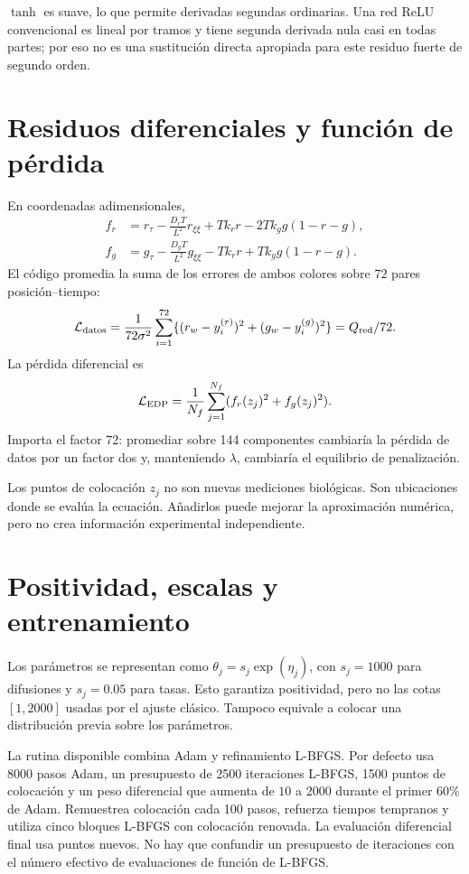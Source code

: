 \documentclass[11pt,a4paper]{report}
\begin{document}
$\tanh$ es suave, lo que permite derivadas segundas ordinarias. Una red ReLU convencional es lineal por tramos y tiene segunda derivada nula casi en todas partes; por eso no es una sustitución directa apropiada para este residuo fuerte de segundo orden.

\section{Residuos diferenciales y función de pérdida}
En coordenadas adimensionales,
\begin{align}
f_r&=r_\tau-\frac{D_rT}{L^2}r_{\xi\xi}+Tk_rr-2Tk_gg(1-r-g),\\
f_g&=g_\tau-\frac{D_gT}{L^2}g_{\xi\xi}-Tk_rr+Tk_gg(1-r-g).
\end{align}
El código promedia la suma de los errores de ambos colores sobre $72$ pares posición--tiempo:
\[
\mathcal L_{\rm datos}=\frac{1}{72\sigma^2}\sum_{i=1}^{72}
\{(r_w-y_i^{(r)})^2+(g_w-y_i^{(g)})^2\}=Q_{\rm red}/72.
\]
La pérdida diferencial es
\[
\mathcal L_{\rm EDP}=\frac1{N_f}\sum_{j=1}^{N_f}(f_r(z_j)^2+f_g(z_j)^2).
\]
Importa el factor 72: promediar sobre 144 componentes cambiaría la pérdida de datos por un factor dos y, manteniendo $\lambda$, cambiaría el equilibrio de penalización.

Los puntos de colocación $z_j$ no son nuevas mediciones biológicas. Son ubicaciones donde se evalúa la ecuación. Añadirlos puede mejorar la aproximación numérica, pero no crea información experimental independiente.

\section{Positividad, escalas y entrenamiento}
Los parámetros se representan como $\theta_j=s_j\exp(\eta_j)$, con $s_j=1000$ para difusiones y $s_j=0.05$ para tasas. Esto garantiza positividad, pero no las cotas $[1,2000]$ usadas por el ajuste clásico. Tampoco equivale a colocar una distribución previa sobre los parámetros.

La rutina disponible combina Adam y refinamiento L-BFGS. Por defecto usa 8000 pasos Adam, un presupuesto de 2500 iteraciones L-BFGS, 1500 puntos de colocación y un peso diferencial que aumenta de $10$ a $2000$ durante el primer 60\% de Adam. Remuestrea colocación cada 100 pasos, refuerza tiempos tempranos y utiliza cinco bloques L-BFGS con colocación renovada. La evaluación diferencial final usa puntos nuevos. No hay que confundir un presupuesto de iteraciones con el número efectivo de evaluaciones de función de L-BFGS.
\end{document}
